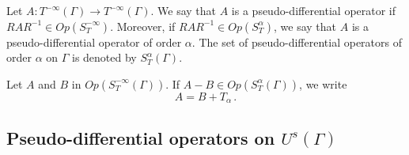 \documentclass[a4paper]{article}
\begin{document}
\begin{Def}
	Let $A : T^{-\infty}(\Gamma) \to T^{-\infty}(\Gamma)$. We say that $A$ is a pseudo-differential operator if $R A R^{-1} \in Op(S^{-\infty}_T)$. Moreover, if $R A R^{-1} \in Op(S^{\alpha}_T)$, we say that $A$ is a pseudo-differential operator of order $\alpha$. The set of pseudo-differential operators of order $\alpha$ on $\Gamma$ is denoted by $S^{\alpha}_T(\Gamma)$.  
\end{Def}

\begin{Def}
	Let $A$ and $B$ in $\textit{Op}(S^{-\infty}_T(\Gamma))$. If $A - B \in \textit{Op}(S^\alpha_T(\Gamma))$, we write 
	\[A = B + T_\alpha \,.\]
\end{Def}

\subsection{Pseudo-differential operators on $U^s(\Gamma)$}
\end{document}
